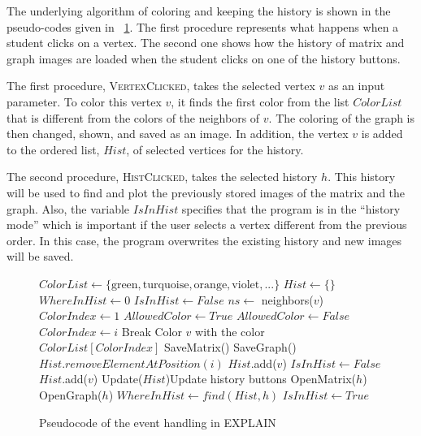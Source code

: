 \documentclass[12pt, oneside]{book}
\begin{document}
The underlying algorithm of coloring and keeping the history is shown in the pseudo-codes given in \figurename~\ref{f:alg}. The first procedure represents what happens when a student clicks on a vertex. The second one shows how the history of matrix and graph images are loaded when the student clicks on one of the history buttons.

The first procedure, \textsc{VertexClicked}, takes the selected vertex $v$ as an input parameter. To color this vertex $v$, it finds the first color from the list $ColorList$ that is different from the colors of the neighbors of $v$. The coloring of the graph is then changed, shown, and saved as an image. In addition, the vertex $v$ is added to the ordered list, $Hist$, of selected vertices for the history.

The second procedure, \textsc{HistClicked}, takes the selected history $h$. This history will be used to find and plot the previously stored images of the matrix and the graph. Also, the variable $IsInHist$ specifies that the program is in the ``history mode'' which is important if the user selects a vertex different from the previous order. In this case, the program overwrites the existing history and new images will be saved.

\begin{figure}
\centering
\begin{algorithmic}[1]
\State $ColorList \gets \{\text{green}, \text{turquoise},  \text{orange}, \text{violet}, ...\}$
\State $Hist \gets \{\}$
\State $WhereInHist \gets 0$
\State $IsInHist \gets False$
\State
{}
\State $ns\gets$  neighbors($v$)
\State $ColorIndex \gets 1$
\State $AllowedColor \gets True$
\State $AllowedColor \gets False$
\EndIf
\EndFor
{}
\State $ColorIndex \gets i$
\State Break
\EndIf
\EndFor
\State Color $v$ with the color $ColorList[ColorIndex]$
\State
{}
\State SaveMatrix()
\State SaveGraph()
\EndIf
{}
\State $Hist.removeElementAtPosition(i)$
\EndFor
\State $Hist$.add($v$)
\State $IsInHist \gets False$
\Else
\State $Hist$.add($v$)
\EndIf
\State Update($Hist$)\Comment Update history buttons
\EndProcedure
\State
\State
{}
\State OpenMatrix($h$)
\State OpenGraph($h$)
\State $WhereInHist \gets find(Hist,h)$
\State $IsInHist \gets True$
\EndProcedure
\end{algorithmic}
\caption{Pseudocode of the event handling in EXPLAIN}
\label{f:alg}
\end{figure}
\end{document}
